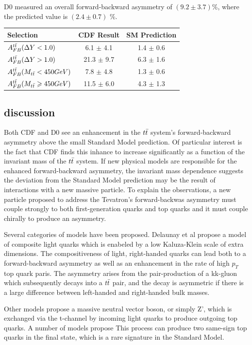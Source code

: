 D0 measured an overall forward-backward asymmetry of $(9.2 \pm 3.7)$\%, where the predicted value is $(2.4 \pm 0.7)$ \%.

\begin{tabular}{lcc}
\hline
Selection                         &   CDF Result    & SM Prediction \\
\hline
$A^{t\bar{t}}_{FB}( \Delta Y < 1.0)$ &   6.1 $\pm$ 4.1 & 1.4 $\pm$ 0.6 \\
$A^{t\bar{t}}_{FB}( \Delta Y > 1.0)$ &  21.3 $\pm$ 9.7 & 6.3 $\pm$ 1.6 \\
\hline
$A^{t\bar{t}}_{FB}( M_{t\bar{t}} < 450 GeV)$ & 7.8 $\pm$ 4.8 & 1.3 $\pm$ 0.6 \\   
$A^{t\bar{t}}_{FB}( M_{t\bar{t}} \geqslant 450 GeV)$ & 11.5 $\pm$ 6.0 & 4.3 $\pm$ 1.3 \\
\hline
\end{tabular}

\subsection{discussion}
Both CDF and D0 see an enhancement in the $t\bar{t}$ system's forward-backward asymmetry above the small Standard Model prediction.
Of particular interest is the fact that CDF finds this inhance to increase significantly as a function of the invariant mass of the $t\bar{t}$ system.
If new physical models are responsible for the enhanced forward-backward asymmetry, the invariant mass dependence suggests the deviation from the Standard Model prediction may be the result of interactions with a new massive particle. %
To explain the observations, a new particle proposed to address the Tevatron's forward-backwas asymmetry must couple strongly to both first-generation quarks and top quarks and it must couple chirally to produce an asymmetry.

Several categories of models have been proposed.
Delaunay et al propose a model of composite light quarks which is enabeled by a low Kaluza-Klein scale of extra dimensions.  %
The compositiveness of light, right-handed quarks can lead both to a forward-backward asymmetry as well as an enhancement in the rate of high $p_T$ top quark paris.
The asymmetry arises from the pair-production of a kk-gluon which subsequently decays into a $t\bar{t}$ pair, and the decay is asymmetric if there is a large difference between left-handed and right-handed bulk masses.

Other models propose a massive neutral vector boson, or simply Z', which is exchanged via the t-channel by incoming light quarks to produce outgoing top quarks. 
A number of models propose %
This process can produce two same-sign top quarks in the final state, which is a rare signature in the Standard Model.

